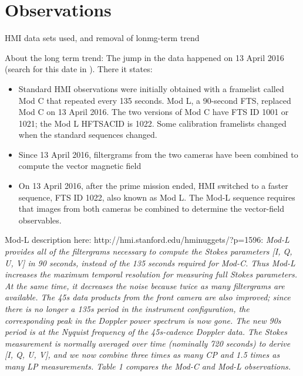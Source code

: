 \documentclass{aa}
\begin{document}
\cite[]{2015ApJ...806..174J}

\cite[]{2013A&A...555A..33B}

\cite[]{2021arXiv210508657F}

\cite[]{2021arXiv210514533R}

\cite[]{ballot2021changes}

\section{Observations}

HMI data sets used, and removal of lonmg-term trend

About the long term trend: The jump in the data happened on 13 April 2016 (search for this date in \cite{2018SoPh..293...45H}). There it states:
\begin{itemize}
\item Standard HMI observations were initially obtained with a framelist called Mod C that
repeated every 135 seconds. Mod L, a 90-second FTS, replaced Mod C on 13 April 2016.
The two versions of Mod C have FTS ID 1001 or 1021; the Mod L HFTSACID is 1022.
Some calibration framelists changed when the standard sequences changed.
\item Since 13 April
2016, filtergrams from the two cameras have been combined to compute the vector magnetic
field \cite[]{2014SoPh..289.3483H,2016SoPh..291.1887C}
\item On 13 April 2016, after the prime mission ended, HMI switched to
a faster sequence, FTS ID 1022, also known as Mod L. The Mod-L sequence requires that
images from both cameras be combined to determine the vector-field observables. 
\end{itemize}
Mod-L description here: http://hmi.stanford.edu/hminuggets/?p=1596: \textsl{
Mod-L provides all of the filtergrams necessary to compute the Stokes parameters [I, Q, U, V] in 90 seconds, instead of the 135 seconds required for Mod-C. Thus Mod-L increases the maximum temporal resolution for measuring full Stokes parameters. At the same time, it decreases the noise because twice as many filtergrams are available. The 45s data products from the front camera are also improved; since there is no longer a 135s period in the instrument configuration, the corresponding peak in the Doppler power spectrum is now gone. The new 90s period is at the Nyquist frequency of the 45s-cadence Doppler data. The Stokes measurement is normally averaged over time (nominally 720 seconds) to derive [I, Q, U, V], and we now combine three times as many CP and 1.5 times as many LP measurements. Table 1 compares the Mod-C and Mod-L observations.}
\end{document}
